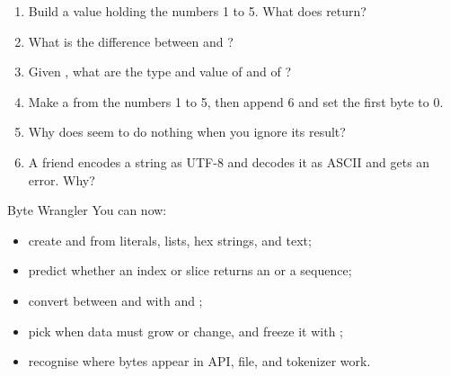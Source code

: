 \begin{practice}
\begin{enumerate}
\item Build a  value holding the numbers 1 to 5. What does  return?
\item What is the difference between  and ?
\item Given , what are the type and value of  and of ?
\item Make a  from the numbers 1 to 5, then append 6 and set the first byte to 0.
\item Why does  seem to do nothing when you ignore its result?
\item A friend encodes a string as UTF-8 and decodes it as ASCII and gets an error. Why?
\end{enumerate}
\end{practice}

\begin{achievement}{Byte Wrangler}
You can now:
\begin{itemize}
\item create  and  from literals, lists, hex strings, and text;
\item predict whether an index or slice returns an  or a sequence;
\item convert between  and  with  and ;
\item pick  when data must grow or change, and freeze it with ;
\item recognise where bytes appear in API, file, and tokenizer work.
\end{itemize}
\end{achievement}
